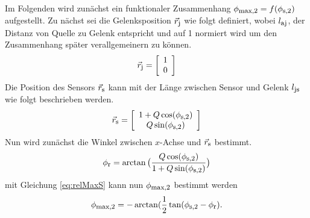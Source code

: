 Im Folgenden wird zunächst ein funktionaler Zusammenhang $\phi_{\textrm{\footnotesize{max,2}}} = f(\phi_{\textrm{\footnotesize{s,2}}})$ aufgestellt. Zu nächst sei die Gelenksposition $\vec{r}_{\textrm{\footnotesize{j}}}$ wie folgt definiert, wobei $l_{\textrm{\footnotesize{aj}}}$, der Distanz von Quelle zu Gelenk entspricht und auf 1 normiert wird um den Zusammenhang später verallgemeinern zu können.  
	\begin{equation}
		\vec{r}_{\textrm{\footnotesize{j}}} = \left[\begin{array}{c} 1\\ 0 \end{array}\right] 
	\end{equation}
	Die Position des Sensors $\vec{r}_{\textrm{\footnotesize{s}}}$ kann mit der Länge zwischen Sensor und Gelenk $l_{\textrm{\footnotesize{js}}}$ wie folgt beschrieben werden.
	\begin{equation}
		\vec{r}_{\textrm{\footnotesize{s}}} = \left[\begin{array}{c} 1+Q\cos(\phi_{\textrm{\footnotesize{s,2}}})\\ Q\sin(\phi_{\textrm{\footnotesize{s,2}}}) \end{array}\right] 
	\end{equation}
	Nun wird zunächst die Winkel zwischen $x$-Achse und $\vec{r}_{\textrm{\footnotesize{s}}}$ bestimmt.
	\begin{equation}
		\phi_{\textrm{\footnotesize{r}}} = \arctan\big(\frac{Q\cos(\phi_{\textrm{\footnotesize{s,2}}})}{1+Q\sin(\phi_{\textrm{\footnotesize{s,2}}})}\big)
	\end{equation}
	mit Gleichung \ref{eq:relMaxS} kann nun $\phi_{\textrm{\footnotesize{max,2}}}$ bestimmt werden 
	\begin{equation}
		\phi_{\textrm{\footnotesize{max,2}}} = -\arctan(\frac{1}{2} \tan(\phi_{\textrm{\footnotesize{s,2}}} - \phi_{\textrm{\footnotesize{r}}} ).
        \label{eq:uniqness_Value_2}
	\end{equation}
	
